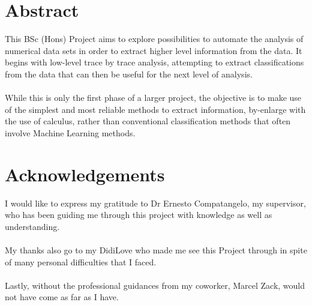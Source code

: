 \documentclass[main.tex]{subfiles}
\begin{document}
  \pagestyle{plain}
  
  \begingroup
    \fontsize{8pt}{10pt}\selectfont
    
    \section*{Abstract}
    
    This BSc (Hons) Project aims to explore possibilities to automate the analysis of numerical data sets in order to extract higher level information from the data. It begins with low-level trace by trace analysis, attempting to extract classifications from the data that can then be useful for the next level of analysis. 
    \\\\
    While this is only the first phase of a larger project, the objective is to make use of the simplest and most reliable methods to extract information, by-enlarge with the use of calculus, rather than conventional classification methods that often involve Machine Learning methods.     
  
  \endgroup
  \hrulefill
  
  \section*{Acknowledgements}
    
    I would like to express my gratitude to Dr Ernesto Compatangelo, my supervisor, who has been guiding me through this project with knowledge as well as understanding.
    \\\\
    My thanks also go to my DidiLove who made me see this Project through in spite of many personal difficulties that I faced.
    \\\\
    Lastly, without the professional guidances from my coworker, Marcel Zack, would not have come as far as I have.
  
\end{document}
